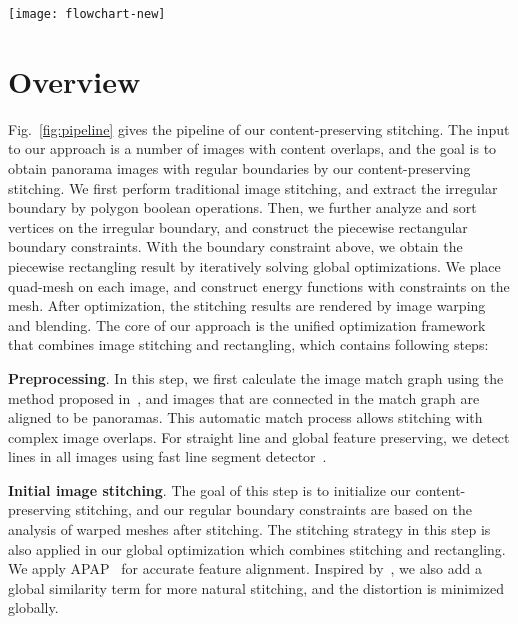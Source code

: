 \documentclass[10pt,journal,compsoc]{IEEEtran}
\begin{document}
\begin{figure*}[t] %
  \centering
  \texttt{[image: flowchart-new]}
  \caption{Pipeline of  our stitching with regular boundary. (a) Input images. (b) initial stitching with irregular boundaries. (c) mesh of initial stitching. (d) outer boundary extracted by polygon boolean extraction. (e) irregular boundary extraction. (f) target regular boundary. (g) mesh of piecewise rectangling. (h) our result. (i) He et al.'s rectangular panorama.} \label{fig:pipeline}
\end{figure*}

 \section{Overview}
Fig.~\ref{fig:pipeline} gives the pipeline of our content-preserving stitching.
The input to our approach is a number of images with content overlaps, and the goal is to obtain panorama images with regular boundaries by our content-preserving stitching.
We first perform traditional image stitching, and extract the irregular boundary by polygon boolean operations.  Then, we further analyze and sort vertices on the irregular boundary, and construct the piecewise rectangular boundary constraints.
With the boundary constraint above, we obtain the piecewise rectangling result by iteratively solving global optimizations.
We place quad-mesh on each image, and construct energy functions with constraints on the mesh. After optimization, the stitching results are rendered by image warping and blending.
The core of our approach is the unified optimization framework that combines image stitching and rectangling, which contains following steps:

\textbf{Preprocessing}.
In this step, we first calculate the image match graph using the method proposed in~\cite{journals/ijcv/BrownL07}, and images that are connected in the match graph are aligned to be panoramas. This automatic match process allows stitching with complex image overlaps.
For straight line and global feature preserving, we detect lines in all images using fast line segment detector~\cite{journals/pami/GioiJMR10}.

\textbf{Initial image stitching}.
The goal of this step is to initialize our content-preserving stitching, and our regular boundary constraints are based on the analysis of warped meshes after stitching. The stitching strategy in this step is also applied in our global optimization which combines stitching and rectangling.
We apply APAP~\cite{journals/pami/ZaragozaCTBS14} for accurate feature alignment.
Inspired by~\cite{conf/eccv/ChenC16}, we also add a global similarity term for more natural stitching, and the distortion is minimized globally.
\end{document}
